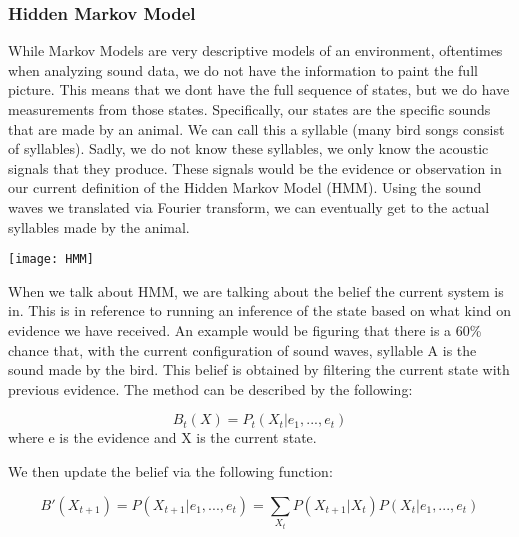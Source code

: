 \subsubsection{Hidden Markov Model}
While Markov Models are very descriptive models of an environment, oftentimes when analyzing sound data, we do not have the information to paint the full picture. This means that we don\textquotesingle t have the full sequence of states, but we do have measurements from those states. Specifically, our states are the specific sounds that are made by an animal. We can call this a syllable (many bird songs consist of syllables). Sadly, we do not know these syllables, we only know the acoustic signals that they produce. These signals would be the evidence or observation in our current definition of the Hidden Markov Model (HMM). Using the sound waves we translated via Fourier transform, we can eventually get to the actual syllables made by the animal.\par

\begin{center}
  \texttt{[image: HMM]}
\end{center}

When we talk about HMM, we are talking about the belief the current system is in. This is in reference to running an inference of the state based on what kind on evidence we have received. An example would be figuring that there is a 60\% chance that, with the current configuration of sound waves, syllable A is the sound made by the bird. This belief is obtained by filtering the current state with previous evidence. The method can be described by the following:\par

\vspace{-32px}
\begin{center}
  \begin{equation}
    B_{t}(X)
    = P_{t}(X_{t} | e_{1}, ..., e_{t})
  \end{equation}
  where e is the evidence and X is the current state.
\end{center}

We then update the belief via the following function:\par

\vspace{-32px}
\begin{center}
  \begin{equation}
    B'(X_{t+1})
    = P(X_{t+1} | e_{1}, ..., e_{t})
    = \sum_{X_{t}} P(X_{t+1} | X_{t}) P(X_{t} | e_{1}, ..., e_{t})
  \end{equation}
\end{center}

